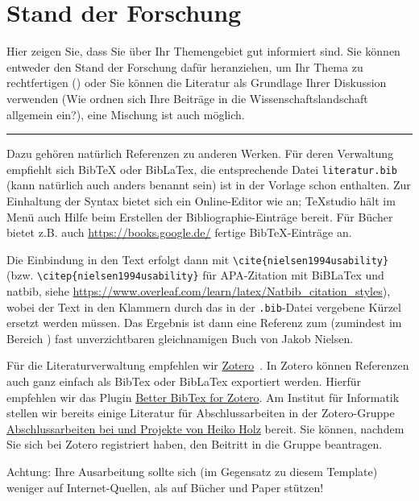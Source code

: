 
\chapter{Stand der Forschung}
Hier zeigen Sie, dass Sie über Ihr Themengebiet gut informiert sind. Sie können entweder den Stand der Forschung dafür heranziehen, um Ihr Thema zu rechtfertigen () oder Sie können die Literatur als Grundlage Ihrer Diskussion verwenden (Wie ordnen sich Ihre Beiträge in die Wissenschaftslandschaft allgemein ein?), eine Mischung ist auch möglich.

\hfil\rule{0.4\textwidth}{0.4pt}

Dazu gehören natürlich Referenzen zu anderen Werken. Für deren Verwaltung empfiehlt sich BibTeX oder BibLaTex, die entsprechende Datei \verb|literatur.bib| (kann natürlich auch anders benannt sein) ist in der Vorlage schon enthalten. Zur Einhaltung der Syntax bietet sich ein Online-Editor wie \cite{BibTexOnlineEditor} an; TeXstudio \cite{texstudio} hält im Menü auch Hilfe beim Erstellen der Bibliographie-Einträge bereit. Für Bücher bietet z.B. auch \url{https://books.google.de/} fertige BibTeX-Einträge an.

Die Einbindung in den Text erfolgt dann mit \verb|\cite{nielsen1994usability}| (bzw. \verb|\citep{nielsen1994usability}| für APA-Zitation mit BiBLaTex und natbib, siehe \url{https://www.overleaf.com/learn/latex/Natbib_citation_styles}), wobei der Text in den Klammern durch das in der \verb|.bib|-Datei vergebene Kürzel ersetzt werden müssen. Das Ergebnis ist dann eine Referenz zum (zumindest im Bereich ) fast unverzichtbaren gleichnamigen Buch \cite{nielsen1994usability} von Jakob Nielsen.

Für die Literaturverwaltung empfehlen wir \href{https://www.zotero.org/}{Zotero}~\cite{zotero}. In Zotero können Referenzen auch ganz einfach als BibTex oder BibLaTex exportiert werden. Hierfür empfehlen wir das Plugin \href{https://github.com/retorquere/zotero-better-bibtex}{Better BibTex for Zotero}. Am Institut für Informatik stellen wir bereits einige Literatur für Abschlussarbeiten in der Zotero-Gruppe \href{https://www.zotero.org/groups/5530859/}{
Abschlussarbeiten bei und Projekte von Heiko Holz} bereit. Sie können, nachdem Sie sich bei Zotero registriert haben, den Beitritt in die Gruppe beantragen.

Achtung: Ihre Ausarbeitung sollte sich (im Gegensatz zu diesem Template) weniger auf Internet-Quellen, als auf Bücher und Paper stützen!
\\

\Blindtext[5]